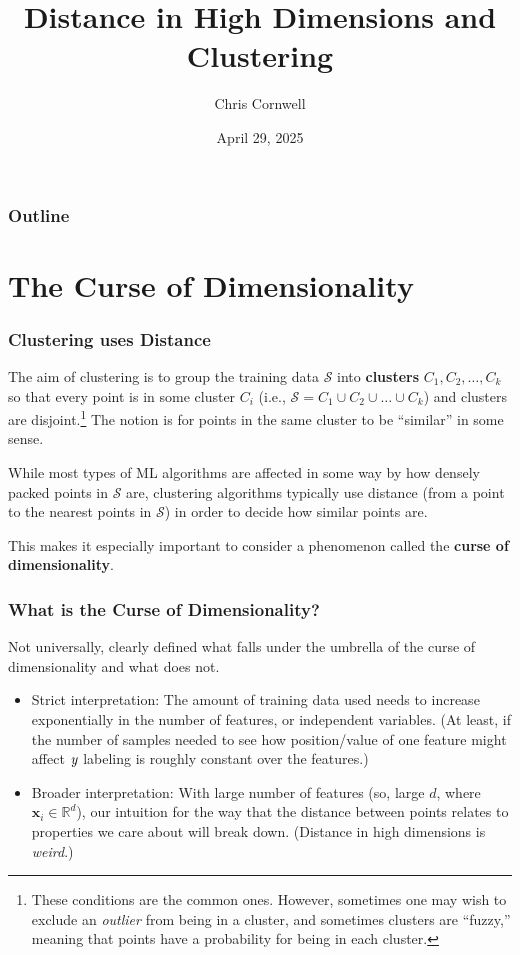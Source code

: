 \documentclass[smaller]{beamer}
\author{Chris Cornwell}
\date{April 29, 2025}
\title{Distance in High Dimensions and Clustering}
\theoremstyle{example}
\newcommand{\x}{\textbf{x}}
\newcommand{\ix}[1]{{\it #1}}
\begin{document}
\begin{frame}
\titlepage
\end{frame}

\begin{frame}
    \frametitle{Outline}
    \tableofcontents
\end{frame}

\section{The Curse of Dimensionality}

\begin{frame}
    \frametitle{Clustering uses Distance}
    The aim of clustering is to group the training data $\mathcal S$ into \textbf{clusters} $C_1,C_2,\ldots,C_k$ so that every point is in some cluster $C_i$ (i.e., $\mathcal S=C_1\cup C_2\cup\ldots \cup C_k$) and clusters are disjoint.\footnote{These conditions are the common ones. However, sometimes one may wish to exclude an \textit{outlier} from being in a cluster, and sometimes clusters are ``fuzzy,'' meaning that points have a probability for being in each cluster.} The notion is for points in the same cluster to be ``similar'' in some sense. 

    While most types of ML algorithms are affected in some way by how densely packed points in $\mathcal S$ are, clustering algorithms typically use distance (from a point to the nearest points in $\mathcal S$) in order to decide how similar points are. 


    This makes it especially important to consider a phenomenon called the \textbf{curse of dimensionality}.  
\end{frame}

\begin{frame}
    \frametitle{What is the Curse of Dimensionality?}
    Not universally, clearly defined what falls under the umbrella of the curse of dimensionality and what does not. 
    \begin{itemize}
        \item Strict interpretation: The amount of training data used needs to increase exponentially in the number of features, or independent variables. (At least, if the number of samples needed to see how position/value of one feature might affect $\ix y$ labeling is roughly constant over the features.)
        \item Broader interpretation: With large number of features (so, large $d$, where $\x_i\in\mathbb R^d$), our intuition for the way that the distance between points relates to properties we care about will break down. (Distance in high dimensions is \textit{weird}.)
    \end{itemize}
\end{frame}
\end{document}
